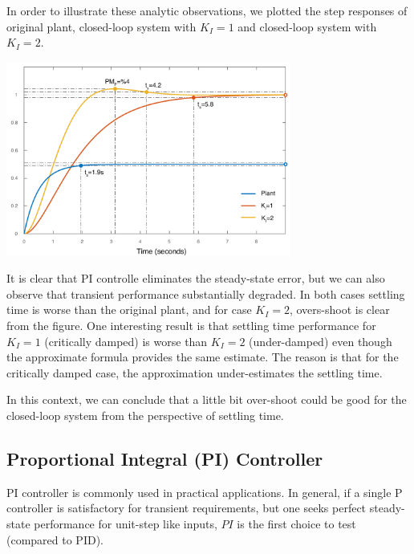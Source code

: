 \documentclass[twoside]{article}
\begin{document}
In order to illustrate these analytic observations, 
we plotted the step responses of original plant, 
closed-loop system with $K_I = 1$ and
closed-loop system with $K_I = 2$. 

\vspace{12 pt}

  \begin{minipage}[h]{1\linewidth}
    \begin{center}
      \includegraphics[width=0.7\textwidth]{PIcase}
    \end{center}
  \end{minipage}

\vspace{12 pt}

It is clear that PI controlle eliminates the
steady-state error, but we can also observe that
transient performance substantially degraded. In both cases
settling time is worse than the original plant,
and for case $K_I = 2$, overs-shoot is clear from the
figure. One interesting result is that settling time performance
for $K_I = 1$ (critically damped) is worse than $K_I = 2$
(under-damped) even though the approximate formula
provides the same estimate. The reason is that for the critically
damped case, the approximation under-estimates 
the settling time. 

In this context, we can conclude that
a little bit over-shoot could be good for the closed-loop
system from the perspective of settling time. 

\subsection{Proportional Integral (PI) Controller}

PI controller is commonly used in practical applications. 
In general, if a single P controller is satisfactory for 
transient requirements, but one seeks perfect steady-state
performance for unit-step like inputs, $PI$ is the first choice to
test (compared to PID). 
\end{document}
